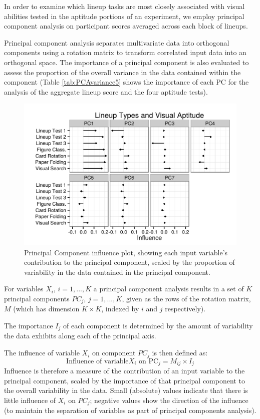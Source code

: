 \documentclass[11pt]{isuthesis}\usepackage[]{graphicx}\usepackage[]{color}
\begin{document}
In order to examine which lineup tasks are most closely associated with visual abilities tested in the aptitude portions of an experiment, we employ principal component analysis on participant scores averaged across each block of lineups.

Principal component analysis separates multivariate data into orthogonal components using a rotation matrix to transform correlated input data into an orthogonal space. The importance of a principal component is also evaluated to assess the proportion of the overall variance in the data contained within the component (Table \ref{tab:PCAvariance5} shows the importance of each PC for the analysis of the aggregate lineup score and the four aptitude tests). 


\begin{figure}[ht]\centering
\includegraphics[width=.5\linewidth]{fig-lineupblockpca-1}
\caption{Principal Component influence plot, showing each input variable's contribution to the principal component, scaled by the proportion of variability in the data contained in the principal component.\label{fig:influence}}
\end{figure}

For variables $X_i$, $i=1, ..., K$ a principal component analysis results in a set of $K$ principal  components $PC_j$, $j=1, ..., K$, given as the rows of the rotation matrix, $M$ (which has dimension $K\times K$, indexed by $i$ and $j$ respectively).

The importance $I_j$ of each component is determined by the amount of variability the data exhibits along each of the principal axis.

The influence of variable $X_i$ on component $PC_j$ is then defined as:
%
$$\text{Influence of variable} X_i \text{ on PC}_j = M_{ij}\times I_j$$
%
Influence is therefore a measure of the contribution of an input variable to the principal component, scaled by the importance of that principal component to the overall variability in the data. Small (absolute) values indicate that there is little influence of $X_i$ on $PC_j$; negative values show the direction of the influence (to maintain the separation of variables as part of principal components analysis). 
\end{document}
